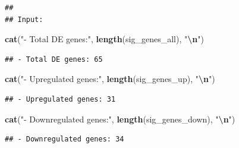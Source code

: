 \documentclass[
]{article}
\newenvironment{Shaded}{\begin{snugshade}}{\end{snugshade}}
\newcommand{\AttributeTok}[1]{\textcolor[rgb]{0.13,0.29,0.53}{#1}}
\newcommand{\ConstantTok}[1]{\textcolor[rgb]{0.56,0.35,0.01}{#1}}
\newcommand{\ControlFlowTok}[1]{\textcolor[rgb]{0.13,0.29,0.53}{\textbf{#1}}}
\newcommand{\DecValTok}[1]{\textcolor[rgb]{0.00,0.00,0.81}{#1}}
\newcommand{\FunctionTok}[1]{\textcolor[rgb]{0.13,0.29,0.53}{\textbf{#1}}}
\newcommand{\NormalTok}[1]{#1}
\newcommand{\SpecialCharTok}[1]{\textcolor[rgb]{0.81,0.36,0.00}{\textbf{#1}}}
\newcommand{\StringTok}[1]{\textcolor[rgb]{0.31,0.60,0.02}{#1}}
\begin{document}
\begin{verbatim}
## 
## Input:
\end{verbatim}

\begin{Shaded}
\begin{Highlighting}[]
\FunctionTok{cat}\NormalTok{(}\StringTok{"{-} Total DE genes:"}\NormalTok{, }\FunctionTok{length}\NormalTok{(sig\_genes\_all), }\StringTok{"}\SpecialCharTok{\textbackslash{}n}\StringTok{"}\NormalTok{)}
\end{Highlighting}
\end{Shaded}

\begin{verbatim}
## - Total DE genes: 65
\end{verbatim}

\begin{Shaded}
\begin{Highlighting}[]
\FunctionTok{cat}\NormalTok{(}\StringTok{"{-} Upregulated genes:"}\NormalTok{, }\FunctionTok{length}\NormalTok{(sig\_genes\_up), }\StringTok{"}\SpecialCharTok{\textbackslash{}n}\StringTok{"}\NormalTok{)}
\end{Highlighting}
\end{Shaded}

\begin{verbatim}
## - Upregulated genes: 31
\end{verbatim}

\begin{Shaded}
\begin{Highlighting}[]
\FunctionTok{cat}\NormalTok{(}\StringTok{"{-} Downregulated genes:"}\NormalTok{, }\FunctionTok{length}\NormalTok{(sig\_genes\_down), }\StringTok{"}\SpecialCharTok{\textbackslash{}n}\StringTok{"}\NormalTok{)}
\end{Highlighting}
\end{Shaded}

\begin{verbatim}
## - Downregulated genes: 34
\end{verbatim}

\begin{Shaded}
\end{Shaded}
\end{document}
